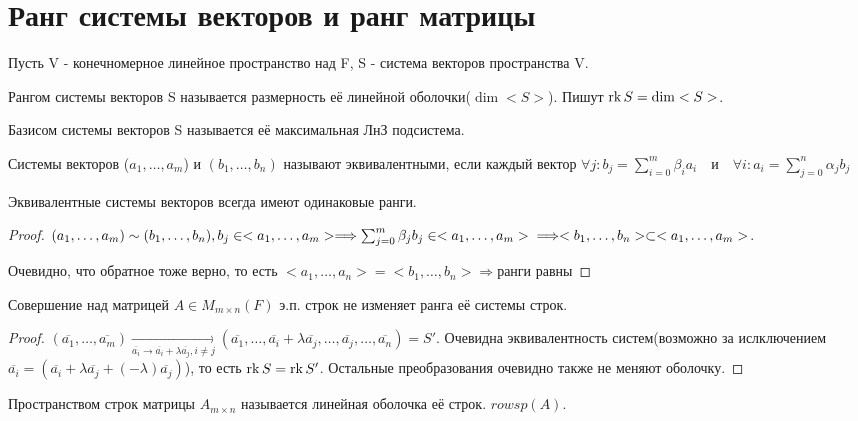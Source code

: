 \section{Ранг системы векторов и ранг матрицы}
Пусть V - конечномерное линейное пространство над F, S - система векторов пространства V.
\begin{definition}
	Рангом системы векторов S называется размерность её линейной оболочки(\(\dim<S>\)). Пишут \(\operatorname{rk} S = \dim <S>\). 
\end{definition}
\begin{definition}
	Базисом системы векторов S называется её максимальная ЛнЗ подсистема.
\end{definition}
\begin{definition}
	Системы векторов (\(a_1, \ldots, a_m\)) и \((b_1,\ldots, b_n)\) называют эквивалентными, 
	если каждый вектор \(\forall j:b_j = \sum_{i=0}^{m} \beta_ia_i \quad \text{и} \quad \forall i: a_i = \sum_{j=0}^{n} \alpha_jb_j\)
\end{definition}
\begin{proposition}
	Эквивалентные системы векторов всегда имеют одинаковые ранги.
\end{proposition}
\begin{proof}

	 \((a_1, \ldots, a_m)\sim(b_1,\ldots, b_n), b_j\in <a_1, \ldots, a_m>\Longrightarrow \sum_{j=0}^{m} \beta_jb_j \in <a_1, \ldots, a_m> \\ 
	 \Longrightarrow <b_1, \ldots, b_n>\subset <a_1,\ldots, a_m>\). 
	 
	 Очевидно, что обратное тоже верно, то есть \(<a_1, \ldots, a_n> = <b_1, \ldots, b_n>\Longrightarrow \)ранги равны
\end{proof}
\begin{proposition}
	Совершение над матрицей \(A\in M_{m\times n}(F)\) э.п. строк не изменяет ранга её системы строк.
\end{proposition}
\begin{proof}
	\((\overline{a_1}, \ldots, \overline{a_m})\underset{\overline{a_i}\to \overline{a_i}+\lambda \overline{a_j}, i\ne j}{\longrightarrow}(\overline{a_1}, \ldots, \overline{a_i}+\lambda \overline{a_j}, \ldots, \overline{a_j},\ldots, \overline{a_n}) = S'\). 
	Очевидна эквивалентность систем(возможно за ислключением \(\overline {a_i} = (\overline{a_i}+\lambda\overline{a_j}+(-\lambda)\overline{a_j})\)), 
	то есть \(\operatorname{rk} S = \operatorname{rk} S'\). 
	Остальные преобразования очевидно также не меняют оболочку.
\end{proof}
\begin{definition}
	Пространством строк матрицы \(A_{m\times n}\) называется линейная оболочка её строк. \(rowsp(A)\).
\end{definition}

